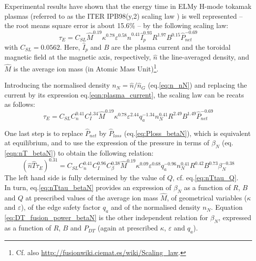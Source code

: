 Experimental results have shown that the energy time in ELMy H-mode tokamak plasmas (referred to as the ITER IPB98(y,2) scaling law \cite[eq.(20)]{ITERphysics_chap2}) is well represented -- the root means square error is about 15.6\% -- by the following scaling law:
\begin{equation}
  \tau_E = C_{SL} \hat M^{0.19} \kappa^{0.78} \varepsilon^{0.58} 
  \hat n^{0.41} \hat I_p^{0.93} R^{1.97} B^{0.15}  \hat P_{net}^{-0.69}
\end{equation}
with $C_{SL} = 0.0562$.
Here, $\hat I_p$ and $B$ are the plasma current and the toroidal magnetic field at the magnetic axis, respectively, $\hat n$ the line-averaged density, and $\hat M$ is the average ion mass (in Atomic Mass Unit)\footnote{Cf. also \url{http://fusionwiki.ciemat.es/wiki/Scaling_law}.}. 

Introducing the normalised density $n_N = \hat n/\hat n_G$ (eq.\ref{eq:n_nN}) and replacing the current by its expression eq.\ref{eqn:plasma_current}, the scaling law can be recats as follows:
\begin{equation}
  \tau_E = C_{SL} C_n^{0.41} C_I^{1.34} \hat M^{0.19} \kappa^{0.78} \varepsilon^{2.44} q_a^{-1.34}
  n_N^{0.41} R^{2.49} B^{1.49} \hat P_{net}^{-0.69}
\end{equation}

One last step is to replace $\hat P_{net}$ by $\hat P_{loss}$ (eq.\ref{eq:Ploss_betaN}), which is equivalent at equilibrium, and to use the expression of the pressure in terms of $\beta_N$ (eq.\ref{eqn:nT_betaN}) to obtain the following relation:
\begin{equation}
  (\hat n\hat T\tau_E)^{0.31} = C_{SL} C_n^{0.41} C_I^{0.96} C_\beta^{0.38} 
    \hat M^{0.19} \kappa^{0.09} \varepsilon^{0.68} q_a^{-0.96}
    n_N^{0.41} R^{0.42} B^{0.73} \beta_N^{-0.38}
\label{eq:nTtau_betaN}
\end{equation}
The left hand side is fully determined by the value of $Q$, cf. eq.\ref{eq:nTtau_Q}. \\

In turn, eq.\ref{eq:nTtau_betaN} provides an expression of $\beta_N$ as a function of $R$, $B$ and $Q$ at prescribed values of the average ion mass $\hat M$, of geometrical variables ($\kappa$ and $\varepsilon$), of the edge safety factor $q_a$ and of the normalised density $n_N$.
Equation \ref{eq:DT_fusion_power_betaN} is the other independent relation for $\beta_N$, expressed as a function of $R$, $B$ and $P_{DT}$ (again at prescribed $\kappa$, $\varepsilon$ and $q_a$).



